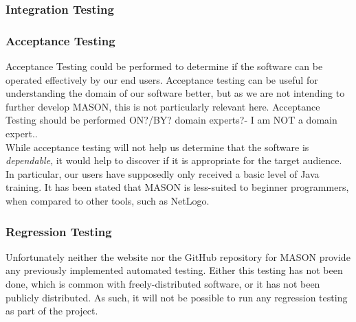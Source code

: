 \documentclass[11pt]{article}
\begin{document}

\subsubsection{Integration Testing}



\subsubsection{Acceptance Testing}
Acceptance Testing could be performed to determine if the software can be operated effectively by our end users.
Acceptance testing can be useful for understanding the domain of our software better, but as we are not intending to further develop MASON, this is not particularly relevant here.
Acceptance Testing should be performed ON?/BY? domain experts?- I am NOT a domain expert..
\\

While acceptance testing will not help us determine that the software is \textit{dependable}, it would help to discover if it is appropriate for the target audience. In particular, our users have supposedly only received a basic level of Java training. It has been stated that MASON is less-suited to beginner programmers, when compared to other tools, such as NetLogo\cite{abm_platforms_review}.


\subsubsection{Regression Testing}
Unfortunately neither the website nor the GitHub repository for MASON provide any previously implemented automated testing.
Either this testing has not been done, which is common with freely-distributed software, or it has not been publicly distributed.
As such, it will not be possible to run any regression testing as part of the project.
\end{document}
